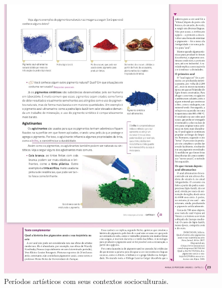 \documentclass[portuguese]{textolivre}
\begin{document}
\begin{figure}[h!]
\begin{minipage}{.9\textwidth}
\begin{minipage}{0.45\textwidth}
 \includegraphics[width=\textwidth]{Imagem4.jpeg}
 \caption{Períodos artísticos com seus contextos socioculturais.}
 \label{fig4}
 \end{minipage}%
 \end{minipage}
\end{figure}
\end{document}
